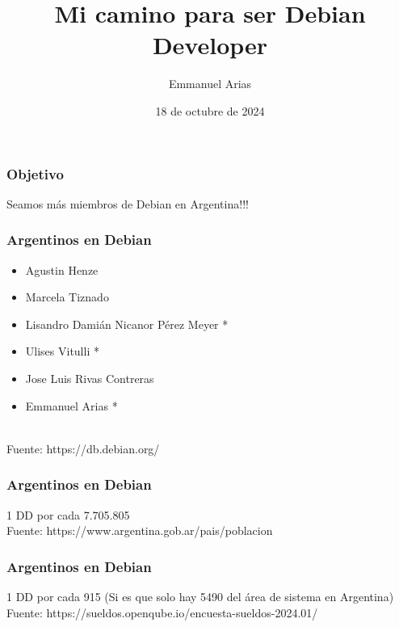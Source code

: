 \documentclass{beamer}
\title{Mi camino para ser Debian Developer}
\author{Emmanuel Arias}
\date{18 de octubre de 2024}
\begin{document}
\begin{frame}[plain]
    \maketitle
\end{frame}
\begin{frame}
  \frametitle {Objetivo}
  \centering
    \Huge Seamos más miembros de Debian en Argentina!!!
\end{frame}
\begin{frame}
    \frametitle {Argentinos en Debian}
    \begin{itemize}
    	\item Agustin Henze
    	\item Marcela Tiznado
    	\item Lisandro Damián Nicanor Pérez Meyer *
    	\item Ulises Vitulli *
    	\item Jose Luis Rivas Contreras
    	\item Emmanuel Arias *
    \end{itemize}

    \vspace{1cm} \\
    \tiny Fuente: https://db.debian.org/
\end{frame}
\begin{frame}
  \frametitle{Argentinos en Debian}
  \centering
  \Huge 1 DD por cada 7.705.805
  \vspace{1cm} \\
  \tiny Fuente: https://www.argentina.gob.ar/pais/poblacion
\end{frame}
\begin{frame}
  \frametitle{Argentinos en Debian}
  \centering
  \Huge 1 DD por cada 915  (Si es que solo hay 5490 del área de sistema en
  Argentina)
  \vspace{1cm} \\
  \tiny Fuente: https://sueldos.openqube.io/encuesta-sueldos-2024.01/
\end{frame}
\end{document}
